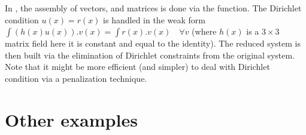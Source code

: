\documentclass[a4paper,11pt,english]{sphinxmanual}
\begin{document}
In , the assembly of vectors, and matrices is done via the 
function. The Dirichlet condition \(u(x) = r(x)\) is handled in the weak form
\(\int (h(x)u(x)).v(x) = \int r(x).v(x)\quad \forall v\) (where \(h(x)\)
is a \(3\times3\) matrix field \textendash{} here it is constant and equal to the
identity). The reduced system  is then built via the elimination of
Dirichlet constraints from the original system. Note that it might be more
efficient (and simpler) to deal with Dirichlet condition via a penalization
technique.


\section{Other examples}
\end{document}
